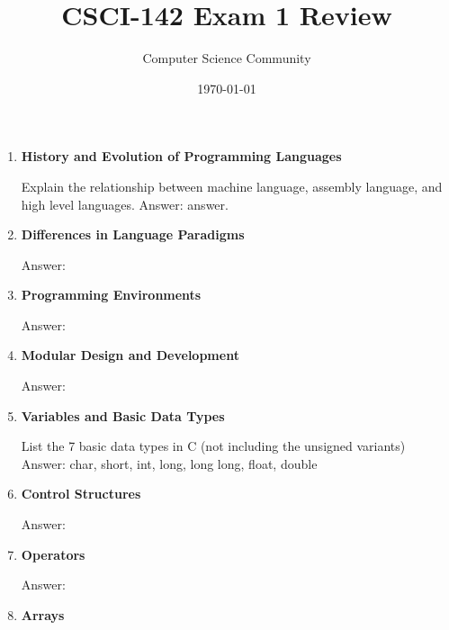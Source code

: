 \documentclass[11pt]{article}
\title{CSCI-142 Exam 1 Review}
\author{Computer Science Community}
\date{\today}
\newenvironment{answer}{\large\lstset{basicstyle=\tiny\ttfamily}\color{white} \small{Answer:}}{}
\newenvironment{answer}{\large\lstset{basicstyle=\large\ttfamily}\color{red} \small{Answer:}}{}
\begin{document}
\header
	\begin{enumerate}

\item \textbf{History and Evolution of Programming Languages}

Explain the relationship between machine language, assembly language, and high level languages.
\begin{answer}
answer.
\end{answer}



\item \textbf{Differences in Language Paradigms}

\begin{answer}
\end{answer}



\item \textbf{Programming Environments}

\begin{answer}
\end{answer}



\item \textbf{Modular Design and Development}

\begin{answer}
\end{answer}



\item \textbf{Variables and Basic Data Types}

List the 7 basic data types in C (not including the unsigned variants)
\begin{answer}
char, short, int, long, long long, float, double
\end{answer}



\item \textbf{Control Structures}

\begin{answer}
\end{answer}



\item \textbf{Operators}

\begin{answer}
\end{answer}



\item \textbf{Arrays}


\end{enumerate}
\end{document}

